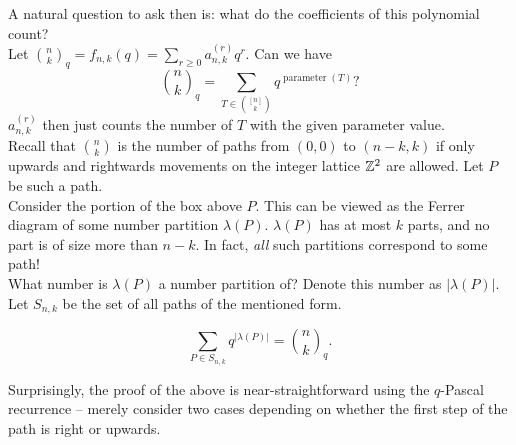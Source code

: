 
	A natural question to ask then is: what do the coefficients of this polynomial count?\\
	Let $\binom{n}{k}_q = f_{n,k}(q) = \sum_{r \ge 0} a_{n,k}^{(r)} q^r$.
	Can we have
	\[ \binom{n}{k}_q = \sum_{T \in \binom{[n]}{k}} q^{\operatorname{parameter}(T)}? \]
	$a_{n,k}^{(r)}$ then just counts the number of $T$ with the given parameter value.\\
	Recall that $\binom{n}{k}$ is the number of paths from $(0,0)$ to $(n-k,k)$ if only upwards and rightwards movements on the integer lattice $\mathbb{Z}^2$ are allowed. Let $P$ be such a path.\\
	Consider the portion of the box above $P$. This can be viewed as the Ferrer diagram of some number partition $\lambda(P)$. $\lambda(P)$ has at most $k$ parts, and no part is of size more than $n-k$. In fact, \emph{all} such partitions correspond to some path!\\
	What number is $\lambda(P)$ a number partition of? Denote this number as $|\lambda(P)|$. Let $S_{n,k}$ be the set of all paths of the mentioned form. 

	\begin{ftheo}
		\[ \sum_{P \in S_{n,k}} q^{|\lambda(P)|} = \binom{n}{k}_q. \]
	\end{ftheo}
	Surprisingly, the proof of the above is near-straightforward using the $q$-Pascal recurrence -- merely consider two cases depending on whether the first step of the path is right or upwards.